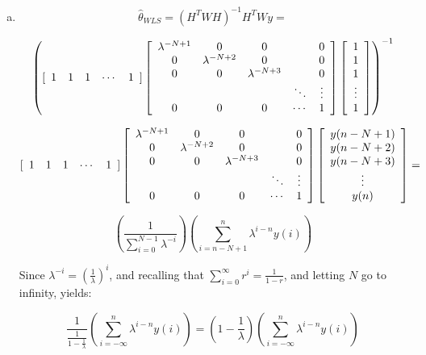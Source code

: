 \documentclass{article}
\begin{document}
\begin{enumerate}[(a)]
\item

\[
\hat\theta_{WLS} = (H^T W H)^{-1} H^T W y =
\]

\[
\left( [\begin{array}{c c c c c}
1 & 1 & 1 & \cdots & 1
\end{array}]
\left[ \begin{array}{c c c c c}
\lambda^{-N+1} & 0 & 0 & & 0 \\
0 & \lambda^{-N+2} & 0 & & 0 \\
0 & 0 & \lambda^{-N+3} & & 0\\
& & & \ddots & \vdots \\
0 & 0 & 0 & \cdots & 1\\
\end{array} \right]
\left[ \begin{array}{c}
1\\
1\\
1\\
\vdots\\
1\\
\end{array}\right] \right)^{-1}
\]

\[
[\begin{array}{c c c c c}
1 & 1 & 1 & \cdots & 1
\end{array}]
\left[ \begin{array}{c c c c c}
\lambda^{-N+1} & 0 & 0 & & 0 \\
0 & \lambda^{-N+2} & 0 & & 0 \\
0 & 0 & \lambda^{-N+3} & & 0\\
& & & \ddots & \vdots \\
0 & 0 & 0 & \cdots & 1\\
\end{array} \right]
\left[ \begin{array}{c}
y(n-N+1)\\
y(n-N+2)\\
y(n-N+3)\\
\vdots\\
y(n)\\
\end{array}\right] =
\]

\[
\left( \frac{1}{\sum_{i=0}^{N-1} \lambda^{-i}} \right)
\left( \sum_{i=n-N+1}^n \lambda^{i-n}y(i) \right)
\]

\vspace{6pt}

Since $\lambda^{-i} = (\frac{1}{\lambda})^i$, and recalling that
$\sum_{i=0}^{\infty} r^i = \frac{1}{1-r}$, and letting $N$ go to infinity,
yields:

\[
\frac{1}{\frac{1}{1-\frac{1}{\lambda}}}\left( \sum_{i=-\infty}^n
\lambda^{i-n}y(i) \right) = \left( 1-\frac{1}{\lambda} \right)
\left( \sum_{i=-\infty}^n \lambda^{i-n}y(i) \right)
\]

\end{enumerate}
\end{document}
